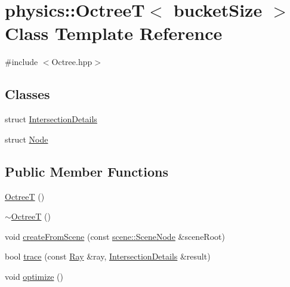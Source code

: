 \hypertarget{classphysics_1_1OctreeT}{\section{physics\-:\-:Octree\-T$<$ bucket\-Size $>$ Class Template Reference}
\label{classphysics_1_1OctreeT}
}


{\ttfamily \#include $<$Octree.\-hpp$>$}

\subsection*{Classes}
\begin{DoxyCompactItemize}
\item 
struct \hyperlink{structphysics_1_1OctreeT_1_1IntersectionDetails}{Intersection\-Details}
\item 
struct \hyperlink{structphysics_1_1OctreeT_1_1Node}{Node}
\end{DoxyCompactItemize}
\subsection*{Public Member Functions}
\begin{DoxyCompactItemize}
\item 
\hyperlink{classphysics_1_1OctreeT_a51fbf4322eaedd2a6fbe66f5b8015bf5}{Octree\-T} ()
\item 
\hyperlink{classphysics_1_1OctreeT_a5ee5f9d7be00ff08dd67c29a541bb8f6}{$\sim$\-Octree\-T} ()
\item 
void \hyperlink{classphysics_1_1OctreeT_a724924114b46c5cd88e17b3d6c6049be}{create\-From\-Scene} (const \hyperlink{classscene_1_1SceneNode}{scene\-::\-Scene\-Node} \&scene\-Root)
\item 
bool \hyperlink{classphysics_1_1OctreeT_aa6884d74a38fdee70865f0bc527a8eee}{trace} (const \hyperlink{structphysics_1_1Ray}{Ray} \&ray, \hyperlink{structphysics_1_1OctreeT_1_1IntersectionDetails}{Intersection\-Details} \&result)
\item 
void \hyperlink{classphysics_1_1OctreeT_aa4bb34d770dbd1a6a72a65c0d4960fb5}{optimize} ()
\end{DoxyCompactItemize}
